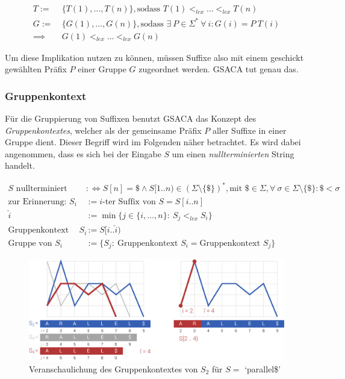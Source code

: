 \documentclass[twoside,a4paper,11pt]{article}
\theoremstyle{break}
\begin{document}
\begin{align*}
	T :=\ &\{ T(1), \dots, T(n) \}, \text{sodass } T(1) <_{lex} \dots <_{lex} T(n) \\
	G :=\ &\{ G(1), \dots, G(n) \}, \text{sodass } \exists\ P \in \Sigma^*\ \forall\ i: G(i) = P\ T(i) \\
	\implies &G(1) <_{lex} \dots <_{lex} G(n)
\end{align*}

Um diese Implikation nutzen zu können, müssen Suffixe also mit einem geschickt gewählten Präfix $P$ einer Gruppe $G$ zugeordnet werden. GSACA tut genau das.

\subsubsection{Gruppenkontext}

Für die Gruppierung von Suffixen benutzt GSACA das Konzept des \textit{Gruppenkontextes}, welcher als der gemeinsame Präfix $P$ aller Suffixe in einer Gruppe dient. Dieser Begriff wird im Folgenden näher betrachtet. Es wird dabei angenommen, dass es sich bei der Eingabe $S$ um einen \textit{nullterminierten} String handelt.

\begin{align*}
	S \text{ nullterminiert} &:\Leftrightarrow S[n] = \$ \land S[1..n) \in (\Sigma \setminus \{\$\})^*, \text{mit } \$ \in \Sigma, \forall\ \sigma \in \Sigma \setminus \{\$\}: \$ < \sigma \\
	\text{zur Erinnerung: } S_i &:= \text{$i$-ter Suffix von $S$} = S[i .. n] \\
	\widehat{i} &:= \min \{ j \in \{ i, \dots, n \}:\ S_j <_{lex} S_i \} \\
	\text{Gruppenkontext von } S_i &:= S[i .. \widehat{i}) \\
	\text{Gruppe von } S_i &:= \{ S_j:\ \text{Gruppenkontext } S_i = \text{Gruppenkontext } S_j \}
\end{align*}

\begin{figure}[h]
	\centering
	\includegraphics[width=\linewidth,bb=0 0 1316 522]{./assets/groupContext.pdf}
	\caption{Veranschaulichung des Gruppenkontextes von $S_2$ für $S =$ `parallel\$'}
\label{fig:groupContext}
\end{figure}
\end{document}
